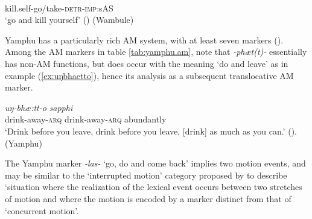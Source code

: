 \documentclass[oneside,a4paper,11pt]{article}
\newcommand{\ipa}[1]{{\phon\textit{#1}}}
\newcommand{\sens}[1]{‘#1’}
\newcommand{\rouge}[1]{{\color{red}#1}}
\begin{document}
\begin{exe}
\ex \label{ex:seilwasta}
\gll \ipa{sei-\rouge{lwa}-s-ta} \\
kill.self-\rouge{go/take}-\textsc{detr}-\textsc{imp}:sAS   \\
\glt \sens{go and kill yourself} (\citealt[439]{opgenort04wambule})  (Wambule)
\end{exe}

Yamphu has a particularly rich AM system, with at least seven markers (\citealt[137-194]{rutgers98yamphu}). Among the AM markers in table \ref{tab:yamphu.am}, note that \ipa{-phæt(t)-} essentially has non-AM functions, but does occur with the meaning `do and leave' as in example (\ref{ex:uŋbhaetto}), hence its analysis as a subsequent translocative AM marker.  
 
 \begin{exe}
\ex \label{ex:uŋbhaetto}
\gll \ipa{uŋ-\rouge{bhæ:tt}-o}	\ipa{uŋ-\rouge{bhæ:tt}-o}	\ipa{sapphi} \\
drink-\rouge{away}-\textsc{arq} drink-\rouge{away}-\textsc{arq}  abundantly\\
\glt \sens{Drink before you leave, drink before you leave, [drink] as much as you can.} (\citealt[150]{rutgers98yamphu}). (Yamphu)
\end{exe}

The Yamphu marker \ipa{-las-} `go, do and come back' implies two motion events, and may be similar to the `interrupted motion' category proposed by \citet[123]{rose15am} to describe `situation where the realization of the lexical event occurs between two stretches of motion and where the motion is encoded by a marker distinct from that of `concurrent motion'.
\end{document}
